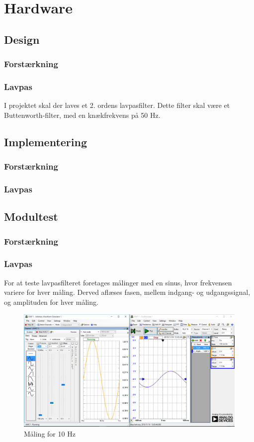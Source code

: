 
\chapter{Hardware}

\section{Design}
\subsection{Forstærkning}
\subsection{Lavpas}
I projektet skal der laves et 2. ordens lavpasfilter. Dette filter skal være et Buttenworth-filter, med en knækfrekvens på 50 Hz. 

\section{Implementering}
\subsection{Forstærkning}
\subsection{Lavpas}


\section{Modultest}
\subsection{Forstærkning}
\subsection{Lavpas}
For at teste lavpasfilteret foretages målinger med en sinus, hvor frekvensen variere for hver måling. Derved aflæses fasen, mellem indgang- og udgangssignal, og amplituden for hver måling.  
\begin{figure}[htb]
	\centering
	\includegraphics[width=1.0\textwidth]{Figurer/10Hz}
	\caption{Måling for 10 Hz}
	\label{fig:maeling10Hz}
\end{figure}
